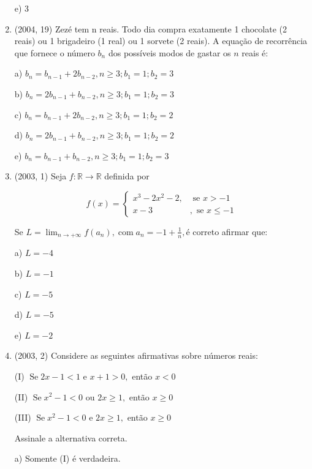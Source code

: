 \documentclass{article}
\begin{document}
\begin{enumerate}
e) 3 \newline


\item(2004, 19) Zezé tem n reais. Todo dia compra exatamente 1 chocolate (2 reais) ou 1 brigadeiro (1 real) ou 1 sorvete (2 reais). A equação de recorrência que fornece o número $b_n$ dos possíveis modos de gastar os $n$ reais é:

a) $b_{n}=b_{n-1}+2 b_{n-2}, n \geq 3 ; b_{1}=1 ; b_{2}=3$

b) $b_{n}=2 b_{n-1}+b_{n-2}, n \geq 3 ; b_{1}=1 ; b_{2}=3$

c) $b_{n}=b_{n-1}+2 b_{n-2}, n \geq 3 ; b_{1}=1 ; b_{2}=2$

d) $b_{n}=2 b_{n-1}+b_{n-2}, n \geq 3 ; b_{1}=1 ; b_{2}=2$

e) $b_{n}=b_{n-1}+b_{n-2}, n \geq 3 ; b_{1}=1 ; b_{2}=3$\newline





\item(2003, 1) Seja $f : \mathbb{R} \rightarrow \mathbb{R}$ definida por

$$f(x)=\left\{\begin{array}{ll}{x^{3}-2 x^{2}-2,} & {\text { se } x>-1} \\ {x-3} & {, \text { se } x \leq-1}\end{array}\right.$$

Se $L=\lim _{n \rightarrow+\infty} f\left(a_{n}\right), \operatorname{com} a_{n}=-1+\frac{1}{n}, é$ correto afirmar que:

a) $L=-4$

b) $L=-1$

c) $L=-5$

d) $L=-5$

e) $L=-2$\newline



\item(2003, 2) Considere as seguintes afirmativas sobre números reais:

(I) $\operatorname{Se} 2 x-1<1$ e $x+1>0,$ então $x<0$

(II) $\operatorname{Se} x^{2}-1<0$ ou $2 x \geq 1,$ então  $x \geq 0$

(III) $\operatorname{Se} x^{2}-1<0$ e $2 x \geq 1,$ então $x \geq 0$

Assinale a alternativa correta.

a) Somente (I) é verdadeira.


\end{enumerate}
\end{document}
